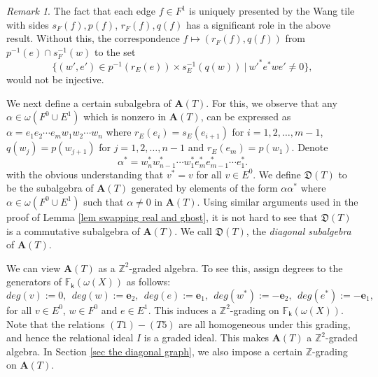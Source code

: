 \documentclass[a4paper,reqno,12pt]{amsart}
\theoremstyle{definition}
\theoremstyle{remark}
\newtheorem{rmk}[thm]{Remark}
\begin{document}
\begin{rmk}\label{rem necessity of injectivity}
The fact that each edge $f\in F^1$ is uniquely presented by the Wang tile with sides $s_F(f),p(f)$, $r_F(f),q(f)$ has a significant role in the above result. Without this, the correspondence $f\longmapsto (r_F(f),q(f))$ from $p^{-1}(e)\cap s_F^{-1}(w)$ to the set \[\{(w',e')\in p^{-1}(r_E(e))\times s_E^{-1}(q(w))~|~w'^*e^*we'\neq 0\},\] would not be injective.     
\end{rmk}
We next define a certain subalgebra of $\mathbf{A}(T)$. For this, we observe that any $\alpha\in \omega(F^0\cup E^1)$ which is nonzero in $\mathbf{A}(T)$, can be expressed as $\alpha=e_1e_2\cdots e_m w_1w_2\cdots w_n$ where $r_E(e_i)=s_E(e_{i+1})$ for $i=1,2,\ldots,m-1$, $q(w_j)=p(w_{j+1})$ for $j=1,2,\ldots,n-1$ and $r_E(e_m)=p(w_1)$. Denote \[\alpha^*=w_n^*w_{n-1}^*\cdots w_1^* e_m^* e_{m-1}^*\cdots e_1^*.\] with the obvious understanding that $v^*=v$ for all $v\in E^0$. We define $\mathfrak{D}(T)$ to be the subalgebra of $\mathbf{A}(T)$ generated by elements of the form $\alpha\alpha^*$ where $\alpha\in \omega(F^0\cup E^1)$ such that $\alpha\neq 0$ in $\mathbf{A}(T)$. Using similar arguments used in the proof of Lemma \ref{lem swapping real and ghost}, it is not hard to see that $\mathfrak{D}(T)$ is a commutative subalgebra of $\mathbf{A}(T)$. We call $\mathfrak{D}(T)$, the \emph{diagonal subalgebra} of $\mathbf{A}(T)$. 

We can view $\mathbf{A}(T)$ as a $\mathbb{Z}^2$-graded algebra. To see this, assign degrees to the generators of $\mathbb{F}_\mathsf{k}(\omega(X))$ as follows: \[deg(v):=0,~~deg(w):=\mathbf{e}_2,~~deg(e):=\mathbf{e}_1,~~deg(w^*):=-\mathbf{e}_2,~~deg(e^*):=-\mathbf{e}_1,\] for all $v\in E^0$, $w\in F^0$ and $e\in E^1$. This induces a $\mathbb{Z}^2$-grading on $\mathbb{F}_\mathsf{k}(\omega(X))$. Note that the relations $(T1)-(T5)$ are all homogeneous under this grading, and hence the relational ideal $I$ is a graded ideal. This makes $\mathbf{A}(T)$ a $\mathbb{Z}^2$-graded algebra. In Section \ref{sec the diagonal graph}, we also impose a certain $\mathbb{Z}$-grading on $\mathbf{A}(T)$. 
\end{document}
